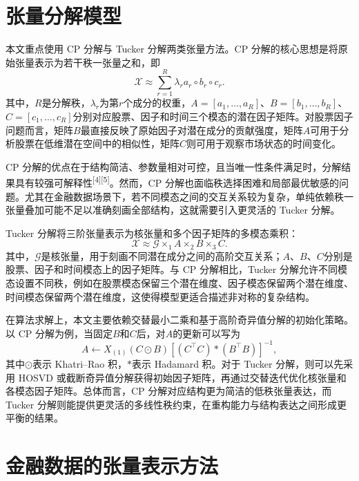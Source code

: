 \section{张量分解模型}

本文重点使用 CP 分解与 Tucker 分解两类张量方法。CP 分解的核心思想是将原始张量表示为若干秩一张量之和，即
\begin{equation}
\mathcal{X}\approx \sum_{r=1}^{R}\lambda_r a_r\circ b_r\circ c_r.
\end{equation}
其中，$R$是分解秩，$\lambda_r$为第$r$个成分的权重，$A=[a_1,\ldots,a_R]$、$B=[b_1,\ldots,b_R]$、$C=[c_1,\ldots,c_R]$分别对应股票、因子和时间三个模态的潜在因子矩阵。对股票因子问题而言，矩阵$B$最直接反映了原始因子对潜在成分的贡献强度，矩阵$A$可用于分析股票在低维潜在空间中的相似性，矩阵$C$则可用于观察市场状态的时间变化。

CP 分解的优点在于结构简洁、参数量相对可控，且当唯一性条件满足时，分解结果具有较强可解释性\textsuperscript{[4][5]}。然而，CP 分解也面临秩选择困难和局部最优敏感的问题。尤其在金融数据场景下，若不同模态之间的交互关系较为复杂，单纯依赖秩一张量叠加可能不足以准确刻画全部结构，这就需要引入更灵活的 Tucker 分解。

Tucker 分解将三阶张量表示为核张量和多个因子矩阵的多模态乘积：
\begin{equation}
\mathcal{X}\approx \mathcal{G}\times_1 A\times_2 B\times_3 C.
\end{equation}
其中，$\mathcal{G}$是核张量，用于刻画不同潜在成分之间的高阶交互关系；$A$、$B$、$C$分别是股票、因子和时间模态上的因子矩阵。与 CP 分解相比，Tucker 分解允许不同模态设置不同秩，例如在股票模态保留三个潜在维度、因子模态保留两个潜在维度、时间模态保留两个潜在维度，这使得模型更适合描述非对称的复杂结构。

在算法求解上，本文主要依赖交替最小二乘和基于高阶奇异值分解的初始化策略。以 CP 分解为例，当固定$B$和$C$后，对$A$的更新可以写为
\begin{equation}
A\leftarrow X_{(1)}(C\odot B)\left[(C^{\top}C)\ast(B^{\top}B)\right]^{-1},
\end{equation}
其中$\odot$表示 Khatri--Rao 积，$\ast$表示 Hadamard 积。对于 Tucker 分解，则可以先采用 HOSVD 或截断奇异值分解获得初始因子矩阵，再通过交替迭代优化核张量和各模态因子矩阵。总体而言，CP 分解对应结构更为简洁的低秩张量表达，而 Tucker 分解则能提供更灵活的多线性秩约束，在重构能力与结构表达之间形成更平衡的结果。

\section{金融数据的张量表示方法}

